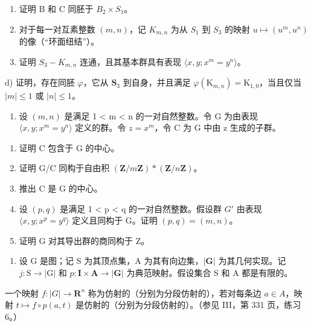 \begin{enumerate}
\def\labelenumi{\alph{enumi})}
\item
  证明 B 和 C 同胚于 \(B_{2} \times S_{1}\)。
\item
  对于每一对互素整数 \((m,n)\)，记 \(K_{m,n}\) 为从 \(S_{1}\) 到 \(S_{3}\) 的映射 \(u\mapsto(u^{m},u^{n})\) 的像（“环面纽结”）。
\item
  证明 \(S_{3}-K_{m,n}\) 连通，且其基本群具有表现 \(\langle x,y;x^{m}=y^{n}\rangle\)。
\end{enumerate}

d) 证明，存在同胚 \(\varphi\)，它从 \(\mathbf{S}_3\) 到自身，并且满足 \(\varphi(\mathrm{K}_{m,n}) = \mathrm{K}_{1,0}\)，当且仅当 \(|m| \leqslant 1\) 或 \(|n| \leqslant 1\)。

\begin{enumerate}
\def\labelenumi{\arabic{enumi})}
\setcounter{enumi}{17}
\tightlist
\item
  设 \((m,n)\) 是满足 1 \textless{} m \textless{} n 的一对自然整数。令 G 为由表现 \(\langle x,y;x^{m}=y^{n}\rangle\) 定义的群。令 \(z=x^{m}\)，令 C 为 G 中由 z 生成的子群。
\end{enumerate}

\begin{enumerate}
\def\labelenumi{\alph{enumi})}
\item
  证明 C 包含于 G 的中心。
\item
  证明 G/C 同构于自由积 \((\mathbf{Z}/m\mathbf{Z})*(\mathbf{Z}/n\mathbf{Z})\)。
\item
  推出 C 是 G 的中心。
\item
  设 \((p,q)\) 是满足 1 \textless{} p \textless{} q 的一对自然整数。假设群 \(G'\) 由表现 \(\langle x,y; x^{p} = y^{q}\rangle\) 定义且同构于 G。证明 \((p,q) = (m,n)\)。
\item
  证明 G 对其导出群的商同构于 Z。
\end{enumerate}

\begin{enumerate}
\def\labelenumi{\arabic{enumi})}
\setcounter{enumi}{18}
\tightlist
\item
  设 G 是图；记 S 为其顶点集，A 为其有向边集，\(|\mathbf{G}|\) 为其几何实现。记 \(j\colon \mathrm{S}\to |\mathrm{G}|\) 和 \(p\colon \mathbf{I}\times \mathbf{A}\to |\mathbf{G}|\) 为典范映射。假设集合 S 和 A 都是有限的。
\end{enumerate}

一个映射 \(f\colon|G|\to\mathbf{R}^{n}\) 称为仿射的（分别为分段仿射的），若对每条边 \(a\in A\)，映射 \(t\mapsto f\circ p(a,t)\) 是仿射的（分别为分段仿射的）。（参见 III，第 331 页，练习 6。）

